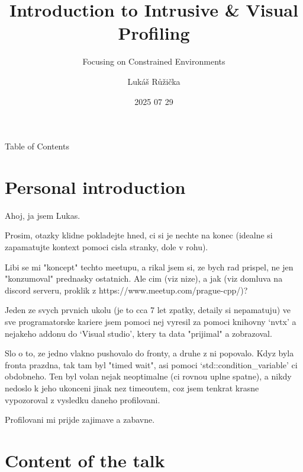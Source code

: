 \documentclass[aspectratio=169]{beamer}
\title{Introduction to Intrusive \& Visual Profiling}
\subtitle{Focusing on Constrained Environments}
\author{Lukáš Růžička}
\institute{Prague C++ Meetup}
\date{2025 07 29}
\begin{document}
\frame{\titlepage}

\begin{frame}{Table of Contents}
\tableofcontents[hideallsubsections]
\end{frame}




\section{Personal introduction}

\begin{frame}
    Ahoj, ja jsem Lukas.

    Prosim, otazky klidne pokladejte hned, ci si je nechte na konec (idealne si zapamatujte kontext pomoci cisla stranky, dole v rohu).

    Libi se mi "koncept" techto meetupu, a rikal jsem si, ze bych rad prispel, ne jen "konzumoval" prednasky ostatnich. Ale cim (viz nize), a jak (viz domluva na discord serveru, proklik z https://www.meetup.com/prague-cpp/)?

    Jeden ze svych prvnich ukolu (je to cca 7 let zpatky, detaily si nepamatuju) ve sve programatorske kariere jsem pomoci nej vyresil za pomoci knihovny `nvtx' a nejakeho addonu do `Visual studio', ktery ta data "prijimal" a zobrazoval.

    Slo o to, ze jedno vlakno pushovalo do fronty, a druhe z ni popovalo. Kdyz byla fronta prazdna, tak tam byl "timed wait", asi pomoci `std::condition\_variable' ci obdobneho. Ten byl volan nejak neoptimalne (ci rovnou uplne spatne), a nikdy nedoslo k jeho ukonceni jinak nez timeoutem, coz jsem tenkrat krasne vypozoroval z vysledku daneho profilovani.

    Profilovani mi prijde zajimave a zabavne.

\end{frame}



\section{Content of the talk}
\end{document}
